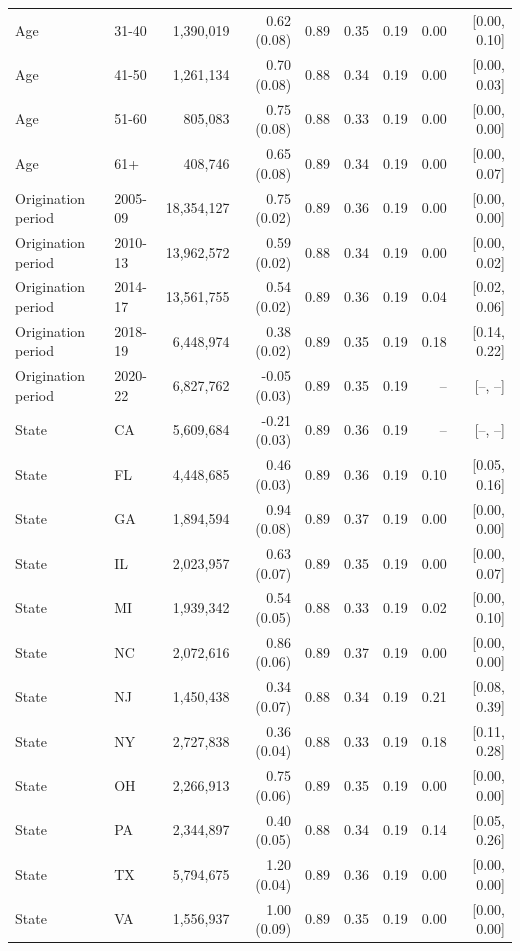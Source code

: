 \begin{tabular}{llrrrrrrr}
Age & 31-40 & 1,390,019 & 0.62 (0.08) & 0.89 & 0.35 & 0.19 & 0.00 & [0.00, 0.10] \\
Age & 41-50 & 1,261,134 & 0.70 (0.08) & 0.88 & 0.34 & 0.19 & 0.00 & [0.00, 0.03] \\
Age & 51-60 & 805,083 & 0.75 (0.08) & 0.88 & 0.33 & 0.19 & 0.00 & [0.00, 0.00] \\
Age & 61+ & 408,746 & 0.65 (0.08) & 0.89 & 0.34 & 0.19 & 0.00 & [0.00, 0.07] \\
\midrule
Origination period & 2005-09 & 18,354,127 & 0.75 (0.02) & 0.89 & 0.36 & 0.19 & 0.00 & [0.00, 0.00] \\
Origination period & 2010-13 & 13,962,572 & 0.59 (0.02) & 0.88 & 0.34 & 0.19 & 0.00 & [0.00, 0.02] \\
Origination period & 2014-17 & 13,561,755 & 0.54 (0.02) & 0.89 & 0.36 & 0.19 & 0.04 & [0.02, 0.06] \\
Origination period & 2018-19 & 6,448,974 & 0.38 (0.02) & 0.89 & 0.35 & 0.19 & 0.18 & [0.14, 0.22] \\
Origination period & 2020-22 & 6,827,762 & -0.05 (0.03) & 0.89 & 0.35 & 0.19 & -- & [--, --] \\
State & CA & 5,609,684 & -0.21 (0.03) & 0.89 & 0.36 & 0.19 & -- & [--, --] \\
State & FL & 4,448,685 & 0.46 (0.03) & 0.89 & 0.36 & 0.19 & 0.10 & [0.05, 0.16] \\
State & GA & 1,894,594 & 0.94 (0.08) & 0.89 & 0.37 & 0.19 & 0.00 & [0.00, 0.00] \\
State & IL & 2,023,957 & 0.63 (0.07) & 0.89 & 0.35 & 0.19 & 0.00 & [0.00, 0.07] \\
State & MI & 1,939,342 & 0.54 (0.05) & 0.88 & 0.33 & 0.19 & 0.02 & [0.00, 0.10] \\
State & NC & 2,072,616 & 0.86 (0.06) & 0.89 & 0.37 & 0.19 & 0.00 & [0.00, 0.00] \\
State & NJ & 1,450,438 & 0.34 (0.07) & 0.88 & 0.34 & 0.19 & 0.21 & [0.08, 0.39] \\
State & NY & 2,727,838 & 0.36 (0.04) & 0.88 & 0.33 & 0.19 & 0.18 & [0.11, 0.28] \\
State & OH & 2,266,913 & 0.75 (0.06) & 0.89 & 0.35 & 0.19 & 0.00 & [0.00, 0.00] \\
State & PA & 2,344,897 & 0.40 (0.05) & 0.88 & 0.34 & 0.19 & 0.14 & [0.05, 0.26] \\
State & TX & 5,794,675 & 1.20 (0.04) & 0.89 & 0.36 & 0.19 & 0.00 & [0.00, 0.00] \\
State & VA & 1,556,937 & 1.00 (0.09) & 0.89 & 0.35 & 0.19 & 0.00 & [0.00, 0.00] \\
\bottomrule
\end{tabular}
